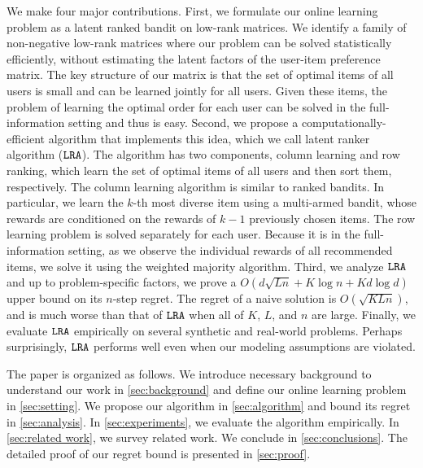 We make four major contributions. First, we formulate our online learning problem as a latent ranked bandit on low-rank matrices. We identify a family of non-negative low-rank matrices where our problem can be solved statistically efficiently, without estimating the latent factors of the user-item preference matrix. The key structure of our matrix is that the set of optimal items of all users is small and can be learned jointly for all users. Given these items, the problem of learning the optimal order for each user can be solved in the full-information setting and thus is easy. Second, we propose a computationally-efficient algorithm that implements this idea, which we call latent ranker algorithm (${\tt LRA}$). The algorithm has two components, column learning and row ranking, which learn the set of optimal items of all users and then sort them, respectively. The column learning algorithm is similar to ranked bandits. In particular, we learn the $k$-th most diverse item using a multi-armed bandit, whose rewards are conditioned on the rewards of $k - 1$ previously chosen items. The row learning problem is solved separately for each user. Because it is in the full-information setting, as we observe the individual rewards of all recommended items,  we solve it using the weighted majority algorithm. Third, we analyze ${\tt LRA}$ and up to problem-specific factors, we prove a $O\left(d \sqrt{L n} + K \log n + K d \log d\right)$ upper bound on its $n$-step regret. The regret of a naive solution is $O(\sqrt{K L n})$, and is much worse than that of ${\tt LRA}$ when all of $K$, $L$, and $n$ are large. Finally, we evaluate ${\tt LRA}$ empirically on several synthetic and real-world problems. Perhaps surprisingly, ${\tt LRA}$ performs well even when our modeling assumptions are violated.

The paper is organized as follows. We introduce necessary background to understand our work in \cref{sec:background} and define our online learning problem in \cref{sec:setting}. We propose our algorithm in \cref{sec:algorithm} and bound its regret in \cref{sec:analysis}. In \cref{sec:experiments}, we evaluate the algorithm empirically. In \cref{sec:related work}, we survey related work. We conclude in \cref{sec:conclusions}. The detailed proof of our regret bound is presented in \cref{sec:proof}.
